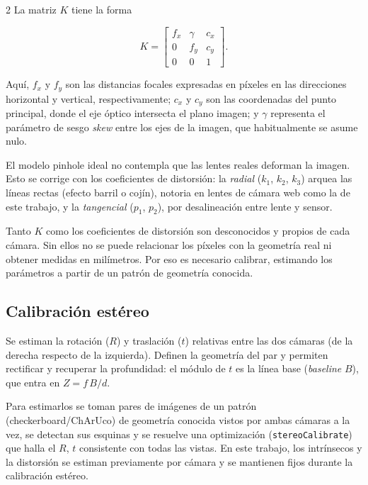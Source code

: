 \documentclass[10pt,a4paper]{article}
\begin{document}
\begin{multicols}{2}
La matriz $K$ tiene la forma

\begin{equation}\label{eq:intrinseca}
K=
\begin{bmatrix}
f_x & \gamma & c_x\\
0 & f_y & c_y\\
0 & 0 & 1
\end{bmatrix}.
\end{equation}

Aquí, $f_x$ y $f_y$ son las distancias focales expresadas en píxeles
en las direcciones horizontal y vertical, respectivamente; $c_x$ y
$c_y$ son las coordenadas del punto principal, donde el eje óptico
intersecta el plano imagen; y $\gamma$ representa el parámetro de
sesgo \emph{skew} entre los ejes de la imagen, que habitualmente se
asume nulo.

El modelo pinhole ideal no contempla que las lentes reales deforman la imagen. Esto se corrige
con los coeficientes de distorsión: la \emph{radial} ($k_1$, $k_2$, $k_3$) arquea las líneas
rectas (efecto barril o cojín), notoria en lentes de cámara web como la de este trabajo, y la
\emph{tangencial} ($p_1$, $p_2$), por desalineación entre lente y sensor.

Tanto $K$ como los coeficientes de distorsión son desconocidos y propios de cada cámara. Sin
ellos no se puede relacionar los píxeles con la geometría real ni obtener medidas en milímetros.
Por eso es necesario calibrar, estimando los parámetros a partir de un patrón de geometría conocida.

\subsection{Calibración estéreo}

Se estiman la rotación ($R$) y traslación ($t$) relativas entre las dos cámaras (de la derecha
respecto de la izquierda). Definen la geometría del par y permiten rectificar y recuperar la
profundidad: el módulo de $t$ es la línea base (\emph{baseline} $B$), que entra en $Z = f\,B/d$.

Para estimarlos se toman pares de imágenes de un patrón (checkerboard/ChArUco) de geometría
conocida vistos por ambas cámaras a la vez, se detectan sus esquinas y se resuelve una
optimización (\texttt{stereoCalibrate}) que halla el $R$, $t$ consistente con todas las vistas.
En este trabajo, los intrínsecos y la distorsión se estiman previamente por cámara y se
mantienen fijos durante la calibración estéreo.


\end{multicols}
\end{document}
